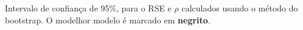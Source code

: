 {\begin{table}[!htb]
    \caption{Intervalo de confiança de 95\%, para o RSE e $\rho$ calculados usando o método do bootstrap. O modelhor modelo é marcado em \textbf{negrito}.}
\label{tab:rse:rho}
\end{table}
}






